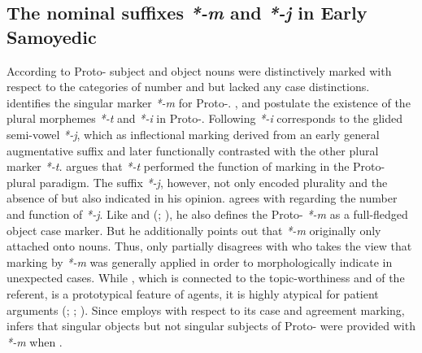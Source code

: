 \documentclass[output=paper]{LSP/langsci}
\begin{document}
\subsection{The nominal suffixes \textit{*-m} and \textit{*-j} in Early Samoyedic}\label{12-wr-sec:2-1}

According to \citet[34--35]{Kunnap2008Finnic} Proto- subject and object nouns were distinctively marked with respect to the categories of number and  but lacked any case distinctions. \citet{Kunnap2008Finnic} identifies the singular  marker \textit{*-m} for Proto-. \citet[172--175]{Katz1979Beitrag}, \citet[29--31]{Janhunen1982Structure} and \citet[65--67]{Honti1995Morphotaktik} postulate the existence of the plural morphemes \textit{*-t} and \textit{*-i} in Proto-. Following \citet[238–239]{Mikola1988Geschichte} \textit{*-i} corresponds to the glided semi-vowel \textit{*-j}, which as inflectional marking derived from an early general augmentative suffix and later functionally contrasted with the other plural marker \textit{*-t.} \citet{Katz1979Beitrag} argues that \textit{*-t} performed the function of  marking in the Proto- plural paradigm. The suffix \textit{*-j}, however, not only encoded plurality and the absence of  but also indicated  in his opinion. \citet[21]{Abondolo1998Uralic} agrees with \citet{Katz1979Beitrag} regarding the number and  function of \textit{*-j}. Like \citet[27]{Salminen1996Comments} and \citeauthor{Janhunen1998Samoyedic} (\citeyear[469]{Janhunen1998Samoyedic}; \citeyear[63]{Janhunen2009Proto-Uralic}), he also defines the Proto- \textit{*-m} as a full-fledged object case marker. 
But he additionally points out that \textit{*-m} originally only attached onto  nouns. 
Thus, \citet{Abondolo1998Uralic} only partially disagrees with \citet[35]{Kunnap2008Finnic} who takes the view that marking by \textit{*-m} was generally applied in order to morphologically indicate  in unexpected cases. 
While , which is connected to the topic-worthiness and  of the referent, is a prototypical feature of agents, it is highly atypical for patient arguments (\cf \citealt[212--214]{Kuno1987Functional}; \citealt[149--158]{Payne1997Describing}; \citealt{Aissen2003Differential}). 
Since  employs  with respect to its case and agreement marking, \citet{Kunnap2008Finnic} infers that singular objects but not singular subjects of Proto- were provided with \textit{*-m} when . 
\end{document}
